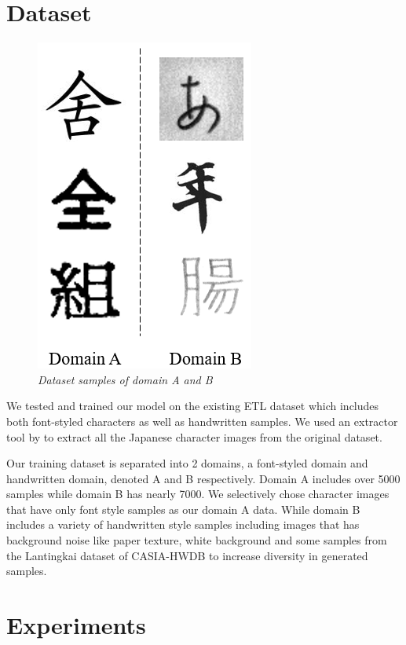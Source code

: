 \documentclass[12pt]{report}
\begin{document}
\section{Dataset}

\begin{figure}[h]
	\centering
	\includegraphics[scale=0.9]{data-examples}
	\caption{\textit{Dataset samples of domain A and B}}
	\label{fig:data-examples}
\end{figure}

We tested and trained our model on the existing ETL dataset\cite{etl} which includes both font-styled characters as well as handwritten samples. We used an extractor tool by \cite{etl-extractor} to extract all the Japanese character images from the original dataset.

Our training dataset is separated into 2 domains, a font-styled domain and handwritten domain, denoted A and B respectively. Domain A includes over 5000 samples while domain B has nearly 7000. We selectively chose character images that have only font style samples as our domain A data. While domain B includes a variety of handwritten style samples including images that has background noise like paper texture, white background and some samples from the Lantingkai dataset of CASIA-HWDB\cite{casia} to increase diversity in generated samples.

\section{Experiments}
\end{document}
